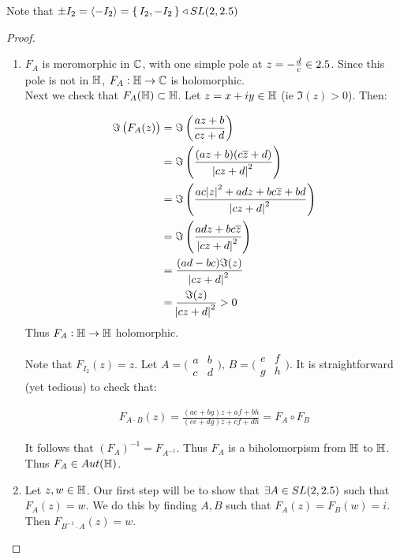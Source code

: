 \begin{note}
Note that $\pm I_2 = \langle -I_2 \rangle = \set{ I_2, -I_2 } \triangleleft SL(2, 2.5)$ 
\end{note}


\begin{proof}
\phantom{a}

\begin{enumerate}
    \item $F_A$ is meromorphic in $\mathbb{C}$, with one simple pole at $z = - \frac{d}{c} \in 2.5$. Since this pole is not in $\mathbb{H}$, $F_A : \mathbb{H} \to \mathbb{C}$ is holomorphic.\\
    
    Next we check that $F_A(\mathbb{H}) \subset \mathbb{H}$. Let $z = x+iy \in \mathbb{H}$ (ie $\Im(z) >0$). Then:
    
    \begin{align*}
        \Im \left( F_A(z) \right) &= \Im \left( \frac{az+b}{cz+d} \right)\\
        &= \Im \left( \frac{(az+b)(c\overline{z} +d)}{\abs{cz+d}^2} \right)\\
        &= \Im \left( \frac{ac\abs{z}^2 + adz + bc\overline{z} + bd}{\abs{cz+d}^2} \right)\\
        &= \Im \left( \frac{ adz + bc\overline{z} }{\abs{cz+d}^2} \right)\\
        &= \frac{{}(ad-bc) \Im (z)}{\abs{cz+d}^2}\\
        &= \frac{\Im (z)}{\abs{cz+d}^2} > 0
    \end{align*}
    Thus $F_A : \mathbb{H} \to \mathbb{H}$ holomorphic.
    
    Note that $F_{I_2} (z) = z$. Let $A= \big(\begin{smallmatrix}
  a & b\\
  c & d
\end{smallmatrix}\big), \, B = \big(\begin{smallmatrix}
  e & f\\
  g & h
\end{smallmatrix}\big)$. It is straightforward (yet tedious) to check that:

\begin{align*}
    F_{A\cdot B} (z) = \frac{(ae+bg)z+af+bh}{(ce+dg)z+cf+dh} = F_A \circ F_B
\end{align*}

It follows that $(F_A)^{-1} = F_{A^{-1}}$. Thus $F_A$ is a biholomorpism from $\mathbb{H}$ to $\mathbb{H}$. Thus $F_A \in Aut(\mathbb{H})$.
    \item Let $z,w \in \mathbb{H}$. Our first step will be to show that $\exists A \in SL(2, 2.5)$ such that $F_A(z) = w$. We do this by finding $A,B $ such that $F_A(z) = F_B(w) = i$. Then $F_{B^{-1} \cdot A} (z ) = w$.\\
    

\end{enumerate}
\end{proof}
